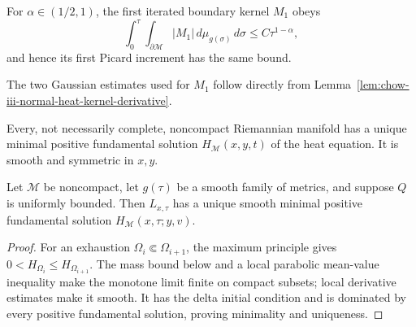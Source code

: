 \begin{remark}
\label{rem:chow-iii-first-boundary-kernel-integrable}
For \(\alpha\in(1/2,1)\), the first iterated boundary kernel \(M_1\) obeys
\[
 \int_0^\tau\!\int_{\partial\mathcal M}|M_1|
 \,d\mu_{g(\sigma)}\,d\sigma\le C\tau^{1-\alpha},
\]
and hence its first Picard increment has the same bound.
\end{remark}

\begin{remark}
\label{rem:chow-iii-normal-derivative-gaussian-bounds}
The two Gaussian estimates used for \(M_1\) follow directly from
Lemma~\ref{lem:chow-iii-normal-heat-kernel-derivative}.
\end{remark}

\begin{theorem}
\label{thm:chow-iii-noncompact-static-heat-kernel}
Every, not necessarily complete, noncompact Riemannian manifold has a unique
minimal positive fundamental solution \(H_{\mathcal M}(x,y,t)\) of the heat
equation.  It is smooth and symmetric in \(x,y\).
\end{theorem}

\begin{theorem}
\label{thm:chow-iii-noncompact-evolving-heat-kernel}
Let \(\mathcal M\) be noncompact, let \(g(\tau)\) be a smooth family of
metrics, and suppose \(Q\) is uniformly bounded.  Then \(L_{x,\tau}\) has a
unique smooth minimal positive fundamental solution
\(H_{\mathcal M}(x,\tau;y,v)\).
\end{theorem}
\begin{proof}
For an exhaustion \(\Omega_i\Subset\Omega_{i+1}\), the maximum principle gives
\(0<H_{\Omega_i}\le H_{\Omega_{i+1}}\).  The mass bound below and a local
parabolic mean-value inequality make the monotone limit finite on compact
subsets; local derivative estimates make it smooth.  It has the delta initial
condition and is dominated by every positive fundamental solution, proving
minimality and uniqueness.
\end{proof}

